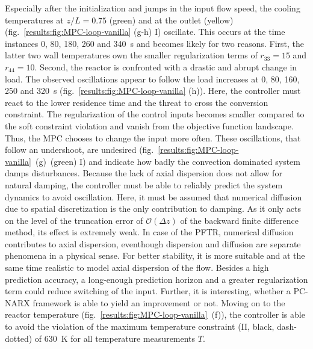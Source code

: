 \newline
\newline
\noindent
Especially after the initialization and jumps in the input flow speed,
the cooling temperatures at $z/L = 0.75$ (green) and 
at the outlet (yellow) (fig.~\ref{results:fig:MPC-loop-vanilla} (g-h) I) oscillate.
This occurs at the time instances \SI{0}{}, \SI{80}{}, \SI{180}{}, \SI{260}{} and \SI{340}{\second}
and becomes likely for two reasons. First, the latter two wall temperatures own the smaller
regularization terms of $r_{33} = 15$ and $r_{44} = 10$.
Second, the reactor is confronted with a drastic and abrupt change in load.
The observed oscillations appear to follow the load increases at 
\SI{0}{}, \SI{80}{}, \SI{160}{}, \SI{250}{} and \SI{320}{\second}
(fig.~\ref{results:fig:MPC-loop-vanilla} (h)).
Here, the controller must react to the lower residence time and the threat to cross the conversion
constraint. 
The regularization of the control inputs becomes smaller compared to the soft constraint
violation and vanish from the objective function landscape.
Thus, the MPC chooses to change the input more often.
These oscillations, that follow an undershoot,
are undesired (fig.~\ref{results:fig:MPC-loop-vanilla}~(g)~(green) I)
and indicate how badly the convection dominated system damps disturbances.
Because the lack of axial dispersion does not allow for natural damping, the controller
must be able to reliably predict the system dynamics to avoid oscillation.
Here, it must be assumed that numerical diffusion due to spatial discretization is the only contribution 
to damping.
As it only acts on the level of the truncation error of
$\mathcal{O}(\Delta z)$ of the backward finite difference method, its effect is extremely weak.
In case of the PFTR, numerical diffusion contributes to axial dispersion, eventhough 
dispersion and diffusion are separate phenomena in a physical sense.
For better stability, it is more suitable and at the same time realistic to model axial dispersion of the flow.
Besides a high prediction accuracy, a long-enough prediction horizon and a greater regularization term
could reduce switching of the input. Further, it is interesting, whether a PC-NARX
framework is able to yield an improvement or not.
\newline
\newline
\noindent
Moving on to the reactor temperature (fig.~\ref{results:fig:MPC-loop-vanilla}~(f)),
the controller is able to avoid the violation of the maximum temperature constraint (II, black, dash-dotted)
of \SI{630}{\kelvin} for all temperature measurements $T$.
